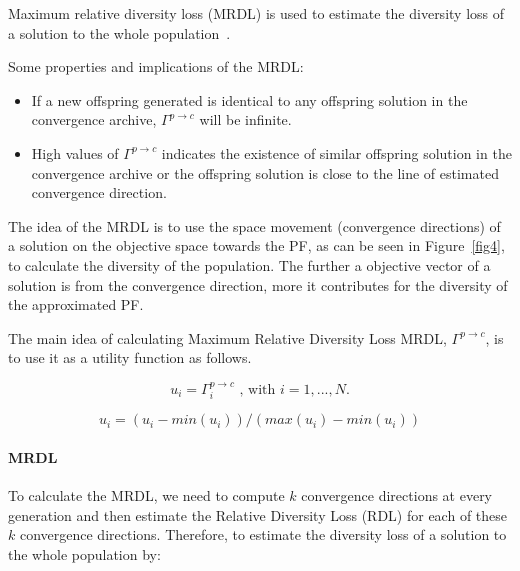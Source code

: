 Maximum relative diversity loss (MRDL) is used to estimate the diversity loss of a solution to the whole population~\cite{gee2015online}.

 Some properties and implications of the MRDL:
\begin{itemize}
	\item If a new offspring generated is identical to any offspring solution in the convergence archive, $\Gamma^{p \rightarrow c}$  will be infinite.
	\item High values of $\Gamma^{p \rightarrow c}$ indicates the existence of similar offspring solution in the convergence archive or the offspring solution is close to the line of estimated convergence direction. 
\end{itemize}

The idea of the MRDL is to use the space movement (convergence directions) of a solution on the objective space towards the PF, as can be seen in Figure~\ref{fig4}, to calculate the diversity of the population. The further a objective vector of a solution is from the convergence direction, more it contributes for the diversity of the approximated PF.



The main idea of calculating Maximum Relative Diversity Loss MRDL, $\Gamma^{p \rightarrow c}$, is to use it as a utility function as follows.

\begin{equation}
u_i = \Gamma^{p \rightarrow c}_i \text{ , with  $i=1,...,N$.}
\end{equation}

\begin{equation}
u_i = (u_i - min(u_i)) / (max(u_i) - min(u_i))
\end{equation}

\paragraph{MRDL} To calculate the MRDL, we need to compute $k$ convergence directions at every generation and then estimate the Relative Diversity Loss (RDL) for each of these $k$ convergence directions. Therefore, to estimate the diversity loss of a solution to the whole population by:
 

